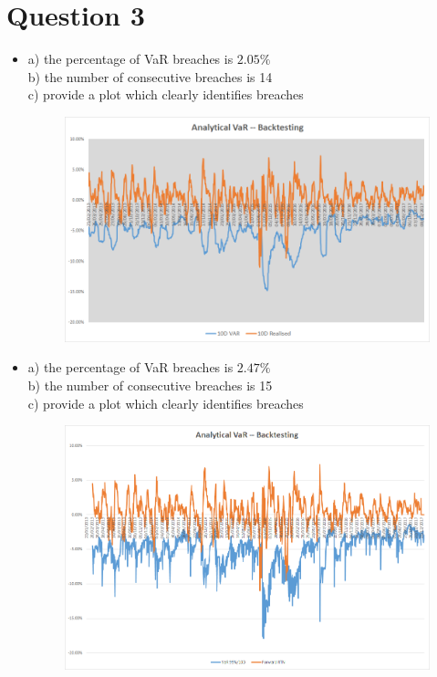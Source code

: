 \documentclass[UTF8]{ctexart}
\begin{document}
\section*{Question 3}
\begin{itemize}
	\item
	      a) the percentage of VaR breaches is $2.05\%$ \\
	      b) the number of consecutive breaches is 14 \\
	      c) provide a plot which clearly identifies breaches\\
	      \begin{figure}[ht]
		      \centering\includegraphics[scale=0.7]{3.1.png}
	      \end{figure}
	\item
	      a) the percentage of VaR breaches is $2.47\%$ \\
	      b) the number of consecutive breaches is 15 \\
	      c) provide a plot which clearly identifies breaches \\
	      \begin{figure}[ht]
		      \centering\includegraphics[scale=0.7]{3.2.png}
	      \end{figure}
\end{itemize}
\end{document}

